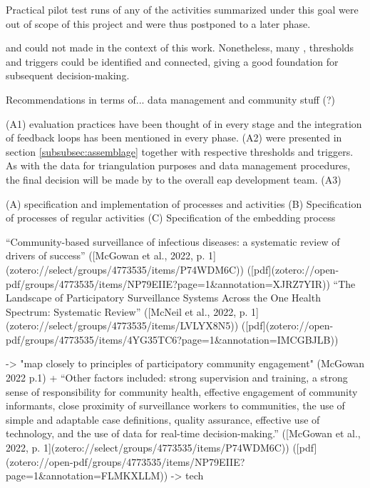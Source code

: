 Practical pilot test runs of any of the activities summarized under this goal were out of scope of this project and were thus postponed to a later phase. 

and could not made in the context of this work. Nonetheless, many , thresholds and triggers could be identified and connected, giving a good foundation for subsequent decision-making. 


Recommendations in terms of... data management and community stuff (?)

(A1) evaluation practices have been thought of in every stage and the integration of feedback loops has been mentioned in every phase. (A2)  were presented in section \ref*{subsubsec:assemblage} together with respective thresholds and triggers. As with the data for triangulation purposes and data management procedures, the final decision will be made by to the overall \acrshort{eap} development team. (A3)

(A) specification and implementation of processes and activities
(B) Specification of processes of regular activities
(C) Specification of the embedding process

“Community-based surveillance of infectious diseases: a systematic review of drivers of success” ([McGowan et al., 2022, p. 1](zotero://select/groups/4773535/items/P74WDM6C)) ([pdf](zotero://open-pdf/groups/4773535/items/NP79EIIE?page=1&annotation=XJRZ7YIR))
“The Landscape of Participatory Surveillance Systems Across the One Health Spectrum: Systematic Review” ([McNeil et al., 2022, p. 1](zotero://select/groups/4773535/items/LVLYX8N5)) ([pdf](zotero://open-pdf/groups/4773535/items/4YG35TC6?page=1&annotation=IMCGBJLB))

-> "map closely to principles of participatory community engagement" (McGowan 2022 p.1)
+ “Other factors included: strong supervision and training, a strong sense of responsibility for community health, effective engagement of community informants, close proximity of surveillance workers to communities, the use of simple and adaptable case definitions, quality assurance, effective use of technology, and the use of data for real-time decision-making.” ([McGowan et al., 2022, p. 1](zotero://select/groups/4773535/items/P74WDM6C)) ([pdf](zotero://open-pdf/groups/4773535/items/NP79EIIE?page=1&annotation=FLMKXLLM))
-> tech


